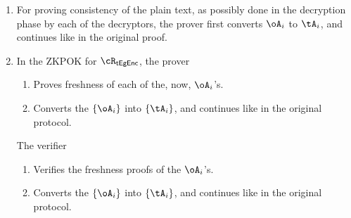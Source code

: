 {\begin{enumerate}
	\item For proving consistency of the plain text, as possibly done in the decryption  phase by each of the decryptors, the  prover first converts $\oA_i$   to $\tA_i$, and continues like in the original proof.
	 
	\item In the ZKPOK for  $\rTsEgEnc$, the prover
	\begin{enumerate}
		\item Proves freshness of each of the, now,   $\oA_i$'s.
		
		\item  	Converts the  $\sset{\oA_i}$ into $\sset{\tA_i}$, and continues like in the original protocol.
		
	\end{enumerate}

    The verifier 
    \begin{enumerate}
    	\item Verifies the freshness proofs of the   $\oA_i$'s.
    	
    	\item  	Converts the  $\sset{\oA_i}$ into $\sset{\tA_i}$, and continues like in the original protocol.
    	
    \end{enumerate}
    
	
\end{enumerate} 
}

